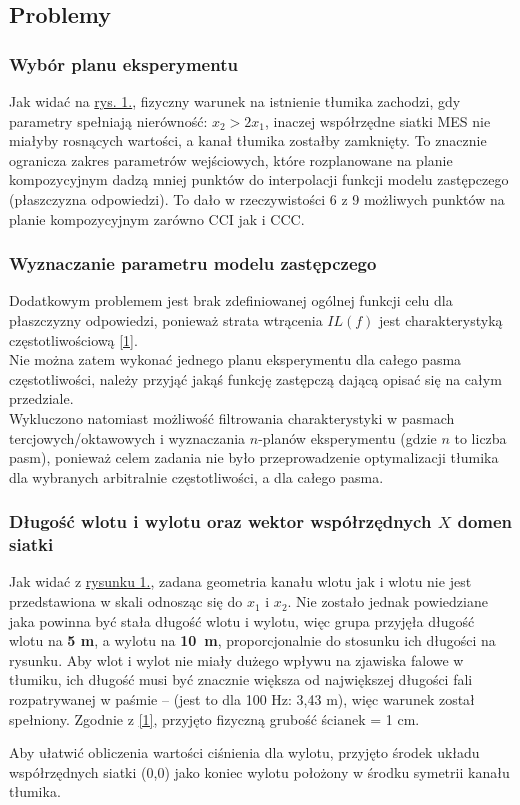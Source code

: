 \documentclass{sprawozdanie-agh}
\begin{document}
\subsection{Problemy}
\subsubsection{Wybór planu eksperymentu}
    Jak widać na \hyperref[rysunek]{rys. 1.}, fizyczny warunek na istnienie tłumika zachodzi, gdy parametry spełniają nierówność: $x_2> 2 x_1$, inaczej współrzędne siatki MES nie miałyby rosnących wartości, a kanał tłumika zostałby zamknięty. To znacznie ogranicza zakres parametrów wejściowych, które rozplanowane na planie kompozycyjnym dadzą mniej punktów do interpolacji funkcji modelu zastępczego (płaszczyzna odpowiedzi). To dało w rzeczywistości 6 z 9 możliwych punktów na planie kompozycyjnym zarówno CCI jak i CCC.\newpage \vspace{-0.6cm}
\subsubsection{Wyznaczanie parametru modelu zastępczego}
    Dodatkowym problemem jest brak zdefiniowanej ogólnej funkcji celu dla płaszczyzny odpowiedzi, ponieważ strata wtrącenia $IL(f)$ jest charakterystyką częstotliwościową \hyperref[ref1]{[1]}.\\Nie można zatem wykonać jednego planu eksperymentu dla całego pasma częstotliwości, należy przyjąć jakąś funkcję zastępczą dającą opisać się na całym przedziale. \\ Wykluczono natomiast możliwość filtrowania charakterystyki w pasmach tercjowych/oktawowych i wyznaczania $n$-planów eksperymentu (gdzie $n$ to liczba pasm), ponieważ celem zadania nie było przeprowadzenie optymalizacji tłumika dla wybranych arbitralnie częstotliwości, a dla całego pasma.
    \subsubsection{Długość wlotu i wylotu oraz wektor współrzędnych $X$ domen siatki}
    Jak widać z \hyperref[rysunek]{rysunku 1.}, zadana geometria kanału wlotu jak i wlotu nie jest przedstawiona w skali odnosząc się do $x_1$ i $x_2$. Nie zostało jednak powiedziane jaka powinna być stała długość wlotu i wylotu, więc grupa przyjęła długość wlotu na \textbf{5 m}, a wylotu na \textbf{10~m}, proporcjonalnie do stosunku ich długości na rysunku. Aby wlot i wylot nie miały dużego wpływu na zjawiska falowe w tłumiku, ich długość musi być znacznie większa od największej długości fali rozpatrywanej w paśmie -- (jest to dla 100 Hz: 3,43 m), więc warunek został spełniony. Zgodnie z \hyperref[ref1]{[1]}, przyjęto fizyczną grubość ścianek = 1 cm.
    \par Aby ułatwić obliczenia wartości ciśnienia dla wylotu, przyjęto środek układu współrzędnych siatki (0,0) jako koniec wylotu położony w środku symetrii kanału tłumika.
\end{document}

